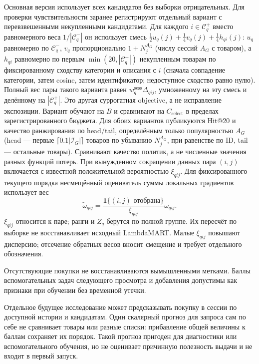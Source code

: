 \documentclass[12pt,a4paper]{article}
\newcommand{\ind}{\mathbf 1}
\theoremstyle{plainru}
\begin{document}
Основная версия использует всех кандидатов без выборки отрицательных.
Для проверки чувствительности заранее регистрируют отдельный
вариант с перевзвешенными некупленными кандидатами. Для каждого
$i\in\mathcal C_q^+$ вместо равномерного веса $1/|\mathcal C_q^-|$
он использует смесь $\tfrac12u_q(j)+\tfrac14v_q(j)+\tfrac14h_{qi}(j)$:
$u_q$ равномерно по $\mathcal C_q^-$, $v_q$ пропорционально
$1+N_j^{A_G}$ (числу сессий $A_G$ с товаром), а $h_{qi}$ равномерно
по первым $\min(20,|\mathcal C_q^-|)$ некупленным товарам по
фиксированному сходству категории и описания с $i$ (сначала
совпадение категории, затем cosine, затем идентификатор; недоступное
сходство равно нулю). Полный вес пары такого варианта равен
$w_q^{\mathrm{sess}}\Delta_{qij}$, умноженному на эту смесь
и делённому на $|\mathcal C_q^+|$. Это другая суррогатная objective,
а не исправление экспозиции. Вариант обучают на $B$ и сравнивают
на $C_{\mathrm{select}}$ в пределах зарегистрированного бюджета.
Для обоих вариантов публикуются Hit@20 и качество ранжирования
по head/tail, определённым только популярностью $A_G$
(head --- первые $\lceil0.1|\mathcal I_G|\rceil$ товаров
по убыванию $N_j^{A_G}$, при равенстве по ID,
tail --- остальные товары). Сравнивают качество политик,
а не численные значения разных функций потерь.
При вынужденном сокращении данных пара $(i,j)$ включается
с известной положительной вероятностью $\xi_{qij}$.
Для фиксированного текущего порядка несмещённый оцениватель
суммы локальных градиентов использует вес
\begin{equation}\label{eq:model-pair-sampling}
\widetilde\omega_{qij}=
\frac{\ind\{(i,j)\text{ отобрана}\}}{\xi_{qij}}
\omega_{qij}.
\end{equation}
$\xi_{qij}$ относится к паре; ранги и $Z_q$ берутся по полной группе.
Их пересчёт по выборке не восстанавливает исходный LambdaMART.
Малые $\xi_{qij}$ повышают дисперсию; отсечение обратных весов
вносит смещение и требует отдельного обозначения.

Отсутствующие покупки не восстанавливаются вымышленными метками.
Баллы вспомогательных задач следующего просмотра и добавления
допустимы как признаки при обучении без временной утечки.

Отдельное будущее исследование может предсказывать покупку в сессии
по доступной истории и кандидатам. Один скалярный прогноз для запроса
сам по себе не сравнивает товары или разные списки: прибавление
общей величины к баллам сохраняет их порядок. Такой прогноз пригоден
для диагностики или вспомогательного обучения, но не оценивает
причинную полезность выдачи и не входит в первый запуск.
\end{document}

